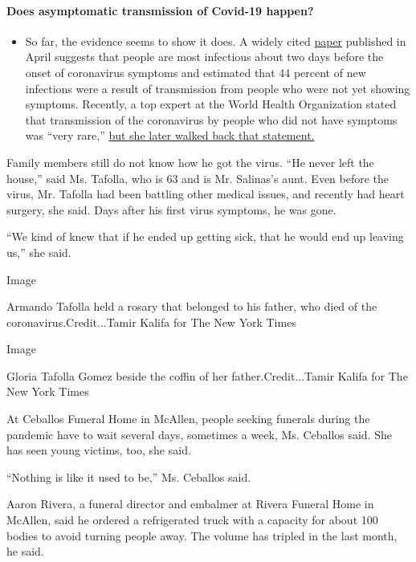 \begin{itemize}
{  \paragraph{Does asymptomatic transmission of Covid-19
  happen?}\label{does-asymptomatic-transmission-of-covid-19-happen}}

  \begin{itemize}
  \tightlist
  \item
    So far, the evidence seems to show it does. A widely cited
    \href{https://www.nature.com/articles/s41591-020-0869-5}{paper}
    published in April suggests that people are most infectious about
    two days before the onset of coronavirus symptoms and estimated that
    44 percent of new infections were a result of transmission from
    people who were not yet showing symptoms. Recently, a top expert at
    the World Health Organization stated that transmission of the
    coronavirus by people who did not have symptoms was ``very rare,''
    \href{https://www.nytimes.com/2020/06/09/world/coronavirus-updates.html?action=click\&pgtype=Article\&state=default\&region=MAIN_CONTENT_3\&context=storylines_faq\#link-1f302e21}{but
    she later walked back that statement.}
  \end{itemize}
\end{itemize}

Family members still do not know how he got the virus. ``He never left
the house,'' said Ms. Tafolla, who is 63 and is Mr. Salinas's aunt. Even
before the virus, Mr. Tafolla had been battling other medical issues,
and recently had heart surgery, she said. Days after his first virus
symptoms, he was gone.

``We kind of knew that if he ended up getting sick, that he would end up
leaving us,'' she said.

Image

Armando Tafolla held a rosary that belonged to his father, who died of
the coronavirus.Credit...Tamir Kalifa for The New York Times

Image

Gloria Tafolla Gomez beside the coffin of her father.Credit...Tamir
Kalifa for The New York Times

At Ceballos Funeral Home in McAllen, people seeking funerals during the
pandemic have to wait several days, sometimes a week, Ms. Ceballos said.
She has seen young victims, too, she said.

``Nothing is like it used to be,'' Ms. Ceballos said.

Aaron Rivera, a funeral director and embalmer at Rivera Funeral Home in
McAllen, said he ordered a refrigerated truck with a capacity for about
100 bodies to avoid turning people away. The volume has tripled in the
last month, he said.

